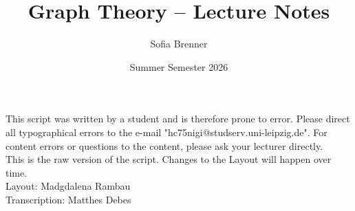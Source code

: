 \documentclass[12pt, a4paper]{article}
\title{Graph Theory -- Lecture Notes}
\author{Sofia Brenner}
\date{Summer Semester 2026}
\begin{document}
\maketitle

\tableofcontents
{}

\newpage

This script was written by a student and is therefore prone to error. Please direct all typographical errors to the e-mail "hc75nigi@studserv.uni-leipzig.de". For content errors or questions to the content, please ask your lecturer directly. \\
This is the raw version of the script. Changes to the Layout will happen over time.\\
Layout: Madgdalena Rambau\\
Transcription: Matthes Debes










\printindex
\end{document}
